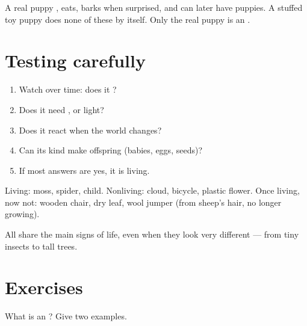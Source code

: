 \begin{example}\label{ex:g2:what-alive:puppy}
A real puppy , eats, barks when surprised, and can later have
puppies. A stuffed toy puppy does none of these by itself. Only the
real puppy is an .
\end{example}

\section{Testing carefully}

\begin{method}[Is it an organism?]\label{met:g2:what-alive:test}
\begin{enumerate}
  \item Watch over time: does it ?
  \item Does it need ,  or light?
  \item Does it react when the world changes?
  \item Can its kind make offspring (babies, eggs, seeds)?
  \item If most answers are yes, it is living.
\end{enumerate}
\end{method}

\begin{example}\label{ex:g2:what-alive:sort}
Living: moss, spider, child. Nonliving: cloud, bicycle, plastic
flower. Once living, now not: wooden chair, dry leaf, wool jumper
(from sheep's hair, no longer growing).
\end{example}

\begin{proposition}\label{prop:g2:what-alive:shared}
All  share the main signs of life, even when they look very
different --- from tiny insects to tall trees.
\end{proposition}
\admitted

\section{Exercises}

\begin{exercise}[$\star$]\label{exo:g2:what-alive:1}
What is an ? Give two examples.
\end{exercise}

